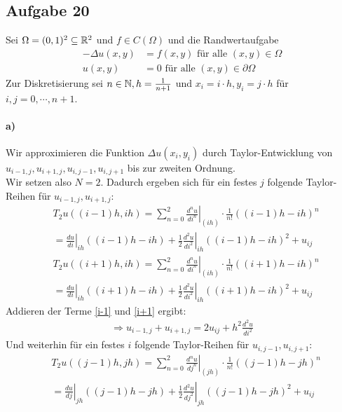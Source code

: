 \subsection*{Aufgabe 20}
Sei $\Omega=(0,1)^2 \subseteq \mathbb R^2$ und $f \in C(\Omega)$ und die Randwertaufgabe
\begin{align*}
-\Delta u(x,y)&=f(x,y) \text{ für alle }(x,y) \in \Omega\\
u(x,y)&=0 \text{ für alle } (x,y) \in \partial\Omega
\end{align*}
Zur Diskretisierung sei $n\in \mathbb N, h=\frac{1}{n+1}$ und $x_i=i \cdot h, y_i=j\cdot h$ für $i,j=0, \cdots, n+1$.
\paragraph*{a)}
Wir approximieren die Funktion $\Delta u(x_i,y_i)$ durch Taylor-Entwicklung von $u_{i-1,j}, u_{i+1,j}, u_{i,j-1}, u_{i,j+1}$ bis zur zweiten Ordnung.\\
\newline
Wir setzen also $N=2$. Dadurch ergeben sich für ein festes $j$ folgende Taylor-Reihen für $u_{i-1,j}, u_{i+1,j}$:
\begin{align}
&T_2 u((i-1)h, ih)=\sum_{n=0}^2 \left. \frac{d^n u}{di^n} \right|_{(ih)} \cdot \frac{1}{n!}((i-1)h-ih)^n\\ &=\left.\frac{du}{di}\right |_{ih} ((i-1)h-ih)+\left.\frac{1}{2}\frac{d^2u}{di^2}\right|_{ih}((i-1)h-ih)^2+u_{ij}\label{i-1}\end{align}
\begin{align}
&T_2 u((i+1)h, ih)=\sum_{n=0}^2 \left. \frac{d^n u}{di^n} \right|_{(ih)} \cdot \frac{1}{n!}((i+1)h-ih)^n\\ &=\left.\frac{du}{di}\right |_{ih} ((i+1)h-ih)+\left.\frac{1}{2}\frac{d^2u}{di^2}\right|_{ih}((i+1)h-ih)^2+u_{ij}\label{i+1}
\end{align}
Addieren der Terme \eqref{i-1} und \eqref{i+1} ergibt:
\begin{align*}
\Rightarrow u_{i-1,j}+u_{i+1,j}=2u_{ij} + h^2 \frac{d^2u}{di^2}
\end{align*}
Und weiterhin für ein festes $i$ folgende Taylor-Reihen für $u_{i,j-1}, u_{i,j+1}$:
\begin{align}
&T_2 u((j-1)h, jh)=\sum_{n=0}^2 \left. \frac{d^n u}{dj^n} \right|_{(jh)} \cdot \frac{1}{n!}((j-1)h-jh)^n\\ &=\left.\frac{du}{dj}\right |_{jh} ((j-1)h-jh)+\left.\frac{1}{2}\frac{d^2u}{dj^2}\right|_{jh}((j-1)h-jh)^2+u_{ij}\label{j-1}\end{align}
